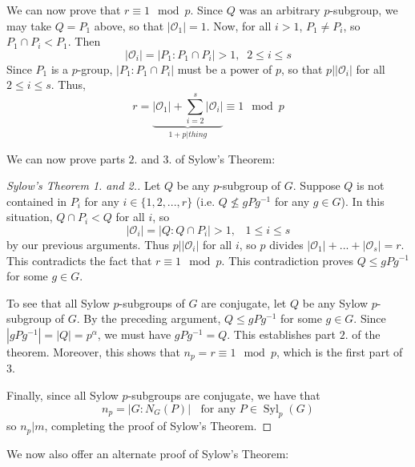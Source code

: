 \documentclass[12pt, a4paper, oneside, openright, titlepage]{book}
\begin{document}
We can now prove that $r \equiv 1\mod p$. Since $Q$ was an arbitrary $p$-subgroup, we may take $Q = P_1$ above, so that $|\mathcal{O}_1| =1$. Now, for all $i > 1$, $P_1 \neq P_i$, so $P_1 \cap P_i < P_1$. Then \begin{equation*}
    |\mathcal{O}_i| = |P_1:P_1\cap P_i| > 1,\;\; 2 \leq i \leq s
\end{equation*}
Since $P_1$ is a $p$-group, $|P_1:P_1\cap P_i|$ must be a power of $p$, so that $p\vert |\mathcal{O}_i|$ for all $2 \leq i \leq s$. Thus, \begin{equation*}
    r = \underbrace{|\mathcal{O}_1| + \sum\limits_{i=2}^s|\mathcal{O}_i|}_{1+p\vert thing} \equiv 1\mod p
\end{equation*}

We can now prove parts $2.$ and $3.$ of Sylow's Theorem:

\begin{proof}[Sylow's Theorem 1. and 2.]
    Let $Q$ be any $p$-subgroup of $G$. Suppose $Q$ is not contained in $P_i$ for any $i \in \{1,2,...,r\}$ (i.e. $Q\nleq gPg^{-1}$ for any $g \in G$). In this situation, $Q\cap P_i < Q$ for all $i$, so \begin{equation*}
        |\mathcal{O}_i| = |Q:Q\cap P_i| > 1,\;\;\; 1 \leq i \leq s
    \end{equation*}
    by our previous arguments. Thus $p\vert |\mathcal{O}_i|$ for all $i$, so $p$ divides $|\mathcal{O}_1|+...+|\mathcal{O}_s| = r$. This contradicts the fact that $r \equiv 1\mod p$. This contradiction proves $Q \leq gPg^{-1}$ for some $g \in G$.

    To see that all Sylow $p$-subgroups of $G$ are conjugate, let $Q$ be any Sylow $p$-subgroup of $G$. By the preceding argument, $Q\leq gPg^{-1}$ for some $g \in G$. Since $|gPg^{-1}| = |Q| = p^{\alpha}$, we must have $gPg^{-1} = Q$. This establishes part $2.$ of the theorem. Moreover, this shows that $n_p = r \equiv 1 \mod p$, which is the first part of $3.$

    Finally, since all Sylow $p$-subgroups are conjugate, we have that \begin{equation*}
        n_p = |G:N_G(P)| \;\;\text{ for any } P \in \operatorname{Syl}_p(G)
    \end{equation*}
    so $n_p\vert m$, completing the proof of Sylow's Theorem.
\end{proof}

We now also offer an alternate proof of Sylow's Theorem:
\end{document}
